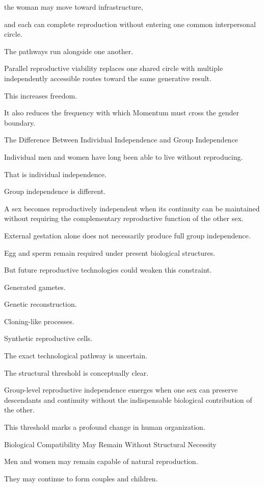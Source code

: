 the woman may move toward infrastructure,

and each can complete reproduction without entering one common interpersonal circle.

The pathways run alongside one another.

Parallel reproductive viability replaces one shared circle with multiple independently accessible routes toward the same generative result.

This increases freedom.

It also reduces the frequency with which Momentum must cross the gender boundary.

The Difference Between Individual Independence and Group Independence

Individual men and women have long been able to live without reproducing.

That is individual independence.

Group independence is different.

A sex becomes reproductively independent when its continuity can be maintained without requiring the complementary reproductive function of the other sex.

External gestation alone does not necessarily produce full group independence.

Egg and sperm remain required under present biological structures.

But future reproductive technologies could weaken this constraint.

Generated gametes.

Genetic reconstruction.

Cloning-like processes.

Synthetic reproductive cells.

The exact technological pathway is uncertain.

The structural threshold is conceptually clear.

Group-level reproductive independence emerges when one sex can preserve descendants and continuity without the indispensable biological contribution of the other.

This threshold marks a profound change in human organization.

Biological Compatibility May Remain Without Structural Necessity

Men and women may remain capable of natural reproduction.

They may continue to form couples and children.

